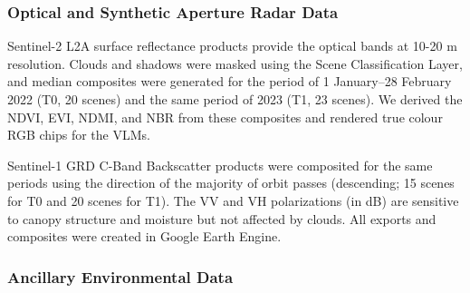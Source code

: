\subsubsection{Optical and Synthetic Aperture Radar Data}

Sentinel-2 L2A surface reflectance products provide the optical bands at 10-20 m resolution. Clouds and shadows were masked using the Scene Classification Layer, and median composites were generated for the period of 1 January–28 February 2022 (T0, 20 scenes) and the same period of 2023 (T1, 23 scenes). We derived the NDVI, EVI, NDMI, and NBR from these composites and rendered true colour RGB chips for the VLMs.

Sentinel-1 GRD C-Band Backscatter products were composited for the same periods using the direction of the majority of orbit passes (descending; 15 scenes for T0 and 20 scenes for T1). The VV and VH polarizations (in dB) are sensitive to canopy structure and moisture but not affected by clouds. All exports and composites were created in Google Earth Engine.

\subsubsection{Ancillary Environmental Data}
